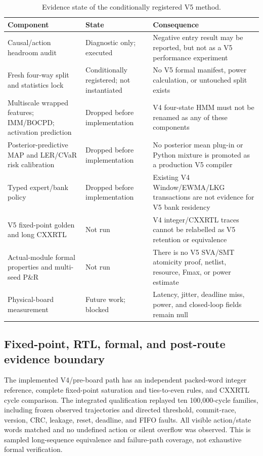 \documentclass[11pt]{article}
\begin{document}
\begin{table}[htbp]
\centering
\footnotesize
\caption{Evidence state of the conditionally registered V5 method.}
\label{tab:v5-stopped-methods}
\begin{tabularx}{\textwidth}{@{}L{0.23\textwidth} L{0.20\textwidth} Y@{}}
\toprule
Component & State & Consequence \\
\midrule
Causal/action headroom audit & Diagnostic only; executed & Negative entry result may be reported, but not as a V5 performance experiment \\
Fresh four-way split and statistics lock & Conditionally registered; not instantiated & No V5 formal manifest, power calculation, or untouched split exists \\
Multiscale wrapped features; IMM/BOCPD; activation prediction & Dropped before implementation & V4 four-state HMM must not be renamed as any of these components \\
Posterior-predictive MAP and LER/CVaR risk calibration & Dropped before implementation & No posterior mean plug-in or Python mixture is promoted as a production V5 compiler \\
Typed expert/bank policy & Dropped before implementation & Existing V4 Window/EWMA/LKG transactions are not evidence for V5 bank residency \\
V5 fixed-point golden and long CXXRTL & Not run & V4 integer/CXXRTL traces cannot be relabelled as V5 retention or equivalence \\
Actual-module formal properties and multi-seed P\&R & Not run & There is no V5 SVA/SMT atomicity proof, netlist, resource, Fmax, or power estimate \\
Physical-board measurement & Future work; blocked & Latency, jitter, deadline miss, power, and closed-loop fields remain null \\
\bottomrule
\end{tabularx}
\end{table}

\subsection{Fixed-point, RTL, formal, and post-route evidence boundary}

The implemented V4/pre-board path has an independent packed-word integer
reference, complete fixed-point saturation and ties-to-even rules, and CXXRTL
cycle comparison.  The integrated qualification replayed ten 100,000-cycle
families, including frozen observed trajectories and directed threshold,
commit-race, version, CRC, leakage, reset, deadline, and FIFO faults.  All
visible action/state words matched and no undefined action or silent overflow
was observed.  This is sampled long-sequence equivalence and failure-path
coverage, not exhaustive formal verification.
\end{document}
